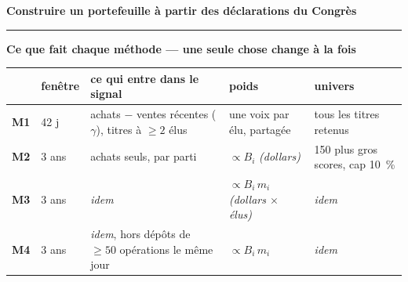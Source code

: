 \documentclass[9pt,a4paper]{extarticle}
\begin{document}
\begin{center}
{\large\bfseries Construire un portefeuille à partir des déclarations du Congrès}
\end{center}
\vspace{0.4mm}\hrule\vspace{0.8mm}
\vspace{1.4mm}

{\color{bleu}\bfseries Ce que fait chaque méthode --- une seule chose change à la fois}\par\vspace{0.6mm}
{\centering\scriptsize
\begin{tabular}{@{}l l l l l@{}}
\toprule
 & \textbf{fenêtre} & \textbf{ce qui entre dans le signal} & \textbf{poids} & \textbf{univers} \\
\midrule
\textbf{M1} & 42 j & achats $-$ ventes récentes ($\gamma$), titres à $\ge2$ élus
            & une voix par élu, partagée & tous les titres retenus \\
\textbf{M2} & 3 ans & achats seuls, par parti & $\propto B_i$ \emph{(dollars)} & 150 plus gros scores, cap 10~\% \\
\textbf{M3} & 3 ans & \emph{idem} & $\propto B_i\,m_i$ \emph{(dollars $\times$ élus)} & \emph{idem} \\
\textbf{M4} & 3 ans & \emph{idem}, hors dépôts de $\ge50$ opérations le même jour & $\propto B_i\,m_i$ & \emph{idem} \\
\bottomrule
\end{tabular}\par}
\vspace{1.6mm}
\end{document}
